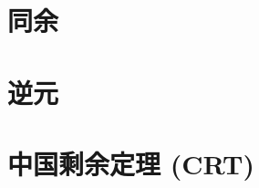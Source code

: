 \section{同余}
\label{cgrunt:sec:cgrunt}


\questions


\section{逆元}
\label{cgrunt:sec:inv}


\questions


\section{中国剩余定理 (CRT)}
\label{cgrunt:sec:crt}


\questions
